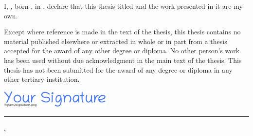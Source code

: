 \noindent I, {\myFirstName} {\myLastName}, born {\myBirthMonth} {\myBirthDay}, {\myBirthYear} in {\myBirthPlace}, declare that this thesis titled \emph{\myTitle} and the work presented in it are my own.

Except where reference is made in the text of the thesis, this thesis contains no material published elsewhere or extracted in whole or in part from a thesis accepted for the award of any other degree or diploma. No other person's work has been used without due acknowledgment in the main text of the thesis. This thesis has not been submitted for the award of any degree or diploma in any other tertiary institution.

\vspace{5em}


\noindent\hspace{0.5em}\includegraphics[width=15em]{figures/signature.png}\\
\noindent\rule[1em]{16.5em}{0.5pt}

\vspace{-1.5em}
\noindent {\myFirstName} {\myLastName} \hspace{12em} {\mySubmissionMonth} {\mySubmissionDay}, {\mySubmissionYear}
